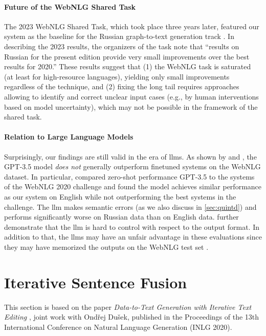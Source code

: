 \paragraph{Future of the WebNLG Shared Task} The 2023 WebNLG Shared Task, which took place three years later, featured our system as the baseline for the Russian graph-to-text generation track \cite{cripwell2023WebNLGShared2023}. In describing the 2023 results, the organizers of the task note that ``results on Russian for the present edition provide very small improvements over the best results for 2020.'' These results suggest that (1) the WebNLG task is saturated (at least for high-resource languages), yielding only small improvements regardless of the technique, and (2) fixing the long tail requires approaches allowing to identify and correct unclear input cases (e.g., by human interventions based on model uncertainty), which may not be possible in the framework of the shared task.


\paragraph{Relation to Large Language Models} Surprisingly, our findings are still valid in the era of \acp{llm}. As shown by  \citet{axelssonUsingLargeLanguage2023} and \citet{yuanEvaluatingGenerativeModels2023}, the GPT-3.5 model \cite{chatgpt} \emph{does not} generally outperform finetuned systems on the WebNLG dataset. In particular, \citet{axelssonUsingLargeLanguage2023} compared zero-shot performance GPT-3.5 to the systems of the WebNLG 2020 challenge and found the model achieves similar performance as our system on English while not outperforming the best systems in the challenge. The \ac{llm} makes semantic errors (as we also discuss in \autoref{sec:quintd}) and performs significantly worse on Russian data than on English data. \citet{yuanEvaluatingGenerativeModels2023} further demonstrate that the \ac{llm} is hard to control with respect to the output format. In addition to that, the \acp{llm} may have an unfair advantage in these evaluations since they may have memorized the outputs on the WebNLG test set \cite{balloccu2024leak}.



\section{Iterative Sentence Fusion}
\label{sec:iterative}

\begin{refbox}
    This section is based on the paper \emph{Data-to-Text Generation with Iterative Text Editing} \cite{kasnerDatatoTextGenerationIterative2020}, joint work with Ondřej Dušek, published in the Proceedings of the 13th International Conference on Natural Language Generation (INLG 2020).
\end{refbox}

